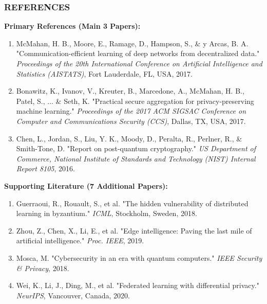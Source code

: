 \documentclass[aspectratio=169]{beamer}
\begin{document}
\begin{frame}
    \frametitle{REFERENCES}
    \scriptsize
    \textbf{Primary References (Main 3 Papers):}
    \begin{enumerate}
        \item[{[1]}] McMahan, H. B., Moore, E., Ramage, D., Hampson, S., \& y Arcas, B. A. "Communication-efficient learning of deep networks from decentralized data." \textit{Proceedings of the 20th International Conference on Artificial Intelligence and Statistics (AISTATS)}, Fort Lauderdale, FL, USA, 2017.
        
        \item[{[2]}] Bonawitz, K., Ivanov, V., Kreuter, B., Marcedone, A., McMahan, H. B., Patel, S., ... \& Seth, K. "Practical secure aggregation for privacy-preserving machine learning." \textit{Proceedings of the 2017 ACM SIGSAC Conference on Computer and Communications Security (CCS)}, Dallas, TX, USA, 2017.
        
        \item[{[3]}] Chen, L., Jordan, S., Liu, Y. K., Moody, D., Peralta, R., Perlner, R., \& Smith-Tone, D. "Report on post-quantum cryptography." \textit{US Department of Commerce, National Institute of Standards and Technology (NIST) Internal Report 8105}, 2016.
    \end{enumerate}
    
    \textbf{Supporting Literature (7 Additional Papers):}
    \begin{enumerate}
        \item[{[4]}] Guerraoui, R., Rouault, S., et al. "The hidden vulnerability of distributed learning in byzantium." \textit{ICML}, Stockholm, Sweden, 2018.
        \item[{[5]}] Zhou, Z., Chen, X., Li, E., et al. "Edge intelligence: Paving the last mile of artificial intelligence." \textit{Proc. IEEE}, 2019.
        \item[{[6]}] Mosca, M. "Cybersecurity in an era with quantum computers." \textit{IEEE Security \& Privacy}, 2018.
        \item[{[7]}] Wei, K., Li, J., Ding, M., et al. "Federated learning with differential privacy." \textit{NeurIPS}, Vancouver, Canada, 2020.
    \end{enumerate}
\end{frame}
\end{document}
